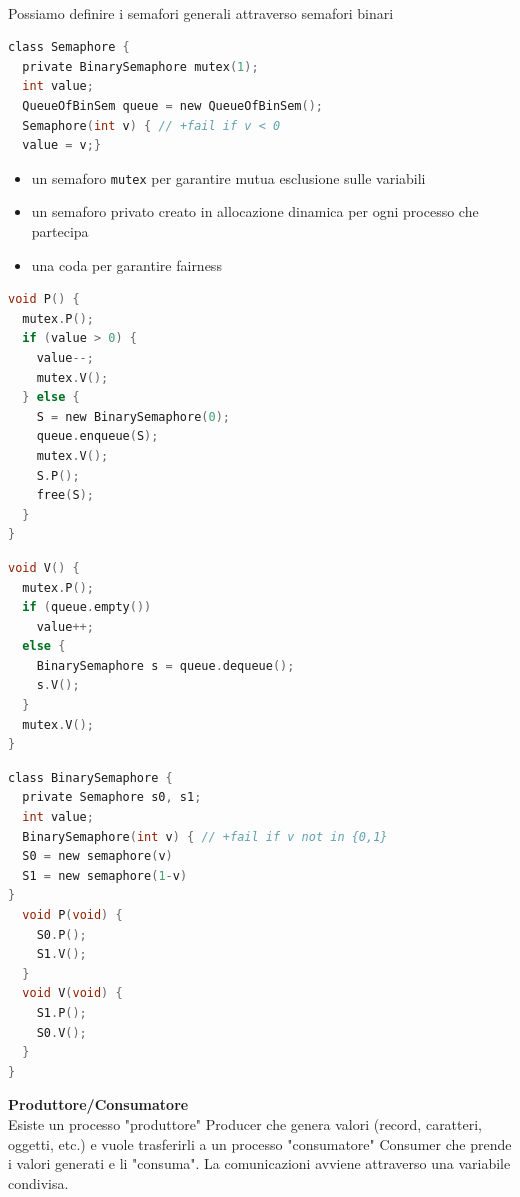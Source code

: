\documentclass[a4paper,12pt]{article}
\begin{document}
\vspace{12em} \\
Possiamo definire i semafori generali attraverso semafori binari \\
\begin{minipage}{0.48\textwidth}
\begin{lstlisting}[language=C]
class Semaphore {
  private BinarySemaphore mutex(1);
  int value;
  QueueOfBinSem queue = new QueueOfBinSem();
  Semaphore(int v) { // +fail if v < 0
  value = v;}
\end{lstlisting}
\end{minipage}
\begin{itemize}
  \item un semaforo \texttt{mutex} per garantire mutua esclusione sulle variabili
  \item un semaforo privato creato in allocazione dinamica per ogni processo che partecipa
  \item una coda per garantire fairness
\end{itemize}
\begin{minipage}{0.48\textwidth}
\begin{lstlisting}[language=C]
void P() {
  mutex.P();
  if (value > 0) {
    value--;
    mutex.V();
  } else {
    S = new BinarySemaphore(0);
    queue.enqueue(S);
    mutex.V();
    S.P();
    free(S);
  }
}
\end{lstlisting}
\end{minipage}
\begin{minipage}{0.48\textwidth}
\begin{lstlisting}[language=C]
void V() {
  mutex.P();
  if (queue.empty())
    value++;
  else {
    BinarySemaphore s = queue.dequeue();
    s.V();
  }
  mutex.V();
}
\end{lstlisting}
\end{minipage}
\begin{lstlisting}[language=C]
class BinarySemaphore {
  private Semaphore s0, s1;
  int value;
  BinarySemaphore(int v) { // +fail if v not in {0,1}
  S0 = new semaphore(v)
  S1 = new semaphore(1-v)
}
  void P(void) {
    S0.P();
    S1.V();
  }
  void V(void) {
    S1.P();
    S0.V();
  }
}
\end{lstlisting}
\vspace{3em} 
\textbf{Produttore/Consumatore\\}
Esiste un processo "produttore" Producer che genera valori (record, caratteri, oggetti, etc.) e vuole trasferirli a un processo "consumatore" Consumer che prende i valori generati e li "consuma". La comunicazioni avviene attraverso una variabile condivisa.
\end{document}
